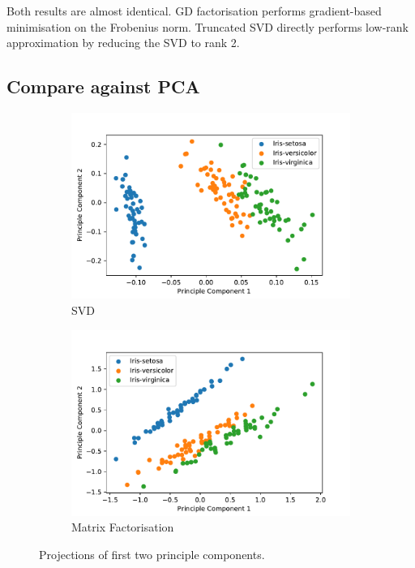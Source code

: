 \documentclass[10pt, twocolumn]{article}
\begin{document}
Both results are almost identical. GD factorisation performs gradient-based minimisation on the Frobenius norm. Truncated SVD directly performs low-rank approximation by reducing the SVD to rank 2.

\subsection{Compare against PCA}

\begin{figure}
    \centering
    \begin{subfigure}{.7\linewidth}
        \includegraphics[width=\linewidth]{Figures/pca_svd.pdf} 
        \caption{SVD}
        \label{fig:svd}
    \end{subfigure}
    \begin{subfigure}{.7\linewidth}
        \includegraphics[width=\linewidth]{Figures/pca_gd.pdf} 
        \caption{Matrix Factorisation}
        \label{fig:mf}
    \end{subfigure}
    \caption{Projections of first two principle components.}
\end{figure}
\end{document}
